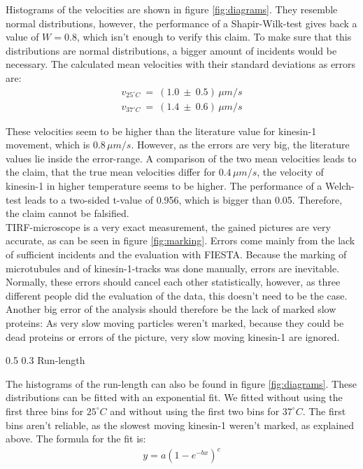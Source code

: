 \documentclass[english, %
parskip=full, %
bibliography=totoc, %
]{scrartcl}
\makeatletter
\renewcommand\subsection{\@startsection 
   {subsection}{2}{0mm}%
   {0.5\baselineskip}%
   {0.3\baselineskip}%
   {\bfseries\sffamily\large}%
   }
\makeatother
\begin{document}
Histograms of the velocities are shown in figure \ref{fig:diagrams}. They resemble normal distributions, however, the performance of a Shapir-Wilk-test gives back a value of $W = 0.8$, which isn't enough to verify this claim. To make sure that this distributions are normal distributions, a bigger amount of incidents would be necessary. The calculated mean velocities with their standard deviations as errors are:
\begin{align*}
v _{25^\circ C} \ = \ (1.0 \ \pm \ 0.5) \, \mu m/s \\
v _{37^\circ C} \ = \ (1.4 \ \pm \ 0.6) \, \mu m/s
\end{align*}

These velocities seem to be higher than the literature value for kinesin-1 movement, which is 0.8\,$\mu m/s$. However, as the errors are very big, the literature values lie inside the error-range. A comparison of the two mean velocities leads to the claim, that the true mean velocities differ for $0.4\, \mu m/s$, the velocity of kinesin-1 in higher temperature seems to be higher. The performance of a Welch-test leads to a two-sided t-value of 0.956, which is bigger than 0.05. Therefore, the claim cannot be falsified. \\
TIRF-microscope is a very exact measurement, the gained pictures are very accurate, as can be seen in figure \ref{fig:marking}. Errors come mainly from the lack of sufficient incidents and the evaluation with FIESTA. Because the marking of microtubules and of kinesin-1-tracks was done manually, errors are inevitable. Normally, these errors should cancel each other statistically, however, as three different people did the evaluation of the data, this doesn't need to be the case. Another big error of the analysis should therefore be the lack of marked slow proteins: As very slow moving particles weren't marked, because they could be dead proteins or errors of the picture, very slow moving kinesin-1 are ignored.

\subsection{Run-length}

The histograms of the run-length can also be found in figure \ref{fig:diagrams}. These distributions can be fitted with an exponential fit. We fitted without using the first three bins for $25^\circ C$ and without using the first two bins for $37^\circ C$. The first bins aren't reliable, as the slowest moving kinesin-1 weren't marked, as explained above. The formula for the fit is:
\begin{align*}
y = a (1 - e^{-bx})^c
\end{align*}
\end{document}
